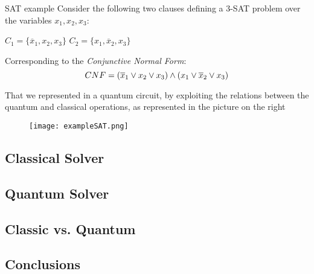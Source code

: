 		\begin{frame}{SAT example}
			\small
			Consider the following two clauses defining a 3-SAT problem over the variables $x_1, x_2, x_3$:
			\begin{center}
				$C_1=\{\overline{x}_1, x_2, x_3\}$
				\hspace{0.5cm}
				$C_2=\{x_1, \overline{x}_2, x_3\}$
			\end{center} 
			Corresponding to the \emph{Conjunctive Normal Form}:
			\begin{equation*}
				\centering
				CNF=(\overline{x}_1\lor x_2\lor x_3)\land(x_1\lor\overline{x}_2\lor x_3)
			\end{equation*}
			\vspace{1cm}
			\begin{minipage}{0.38\textwidth}
				That we represented in a quantum circuit, by exploiting the relations between the quantum and classical operations, as represented in the picture on the right
				\vspace{1.2cm}
			\end{minipage}
			\hfill
			\begin{minipage}{0.6\textwidth}
				\centering
				\begin{figure}[h]
					\centering
					\texttt{[image: exampleSAT.png]}
				\end{figure}
			\end{minipage}
		\end{frame}
	
	
	\subsection{Classical Solver}
		
	
	\subsection{Quantum Solver}
			
	
	\subsection{Classic vs. Quantum}
		
		
	\subsection{Conclusions}
		
		
	
